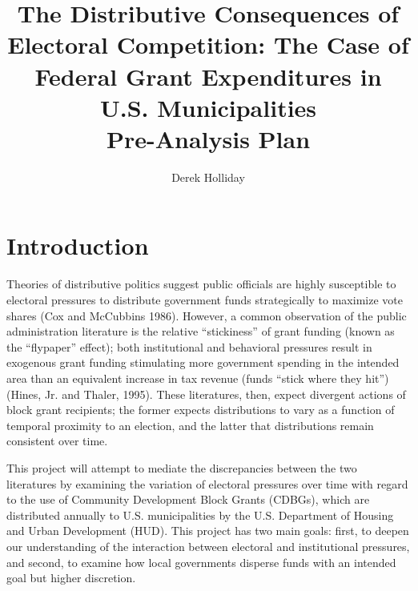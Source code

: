 \documentclass[12pt,a4paper]{article}
\begin{document}
\title{%
	The Distributive Consequences of Electoral Competition: The Case of Federal Grant Expenditures in U.S. Municipalities \\
	\large Pre-Analysis Plan}

\author{Derek Holliday}

\maketitle

\section{Introduction}
\par Theories of distributive politics suggest public officials are highly susceptible to electoral pressures to distribute government funds strategically to maximize vote shares (Cox and McCubbins 1986). However, a common observation of the public administration literature is the relative ``stickiness'' of grant funding (known as the ``flypaper'' effect); both institutional and behavioral pressures result in exogenous grant funding stimulating more government spending in the intended area than an equivalent increase in tax revenue (funds ``stick where they hit'') (Hines, Jr. and Thaler, 1995). These literatures, then, expect divergent actions of block grant recipients; the former expects distributions to vary as a function of temporal proximity to an election, and the latter that distributions remain consistent over time.

\par This project will attempt to mediate the discrepancies between the two literatures by examining the variation of electoral pressures over time with regard to the use of Community Development Block Grants (CDBGs), which are distributed annually to U.S. municipalities by the U.S. Department of Housing and Urban Development (HUD). This project has two main goals: first, to deepen our understanding of the interaction between electoral and institutional pressures, and second, to examine how local governments disperse funds with an intended goal but higher discretion.
\end{document}
